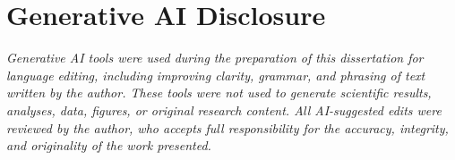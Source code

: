 \section*{Generative AI Disclosure}

\textit{Generative AI tools were used during the preparation of this dissertation for language editing, including improving clarity, grammar, and phrasing of text written by the author. These tools were not used to generate scientific results, analyses, data, figures, or original research content. All AI-suggested edits were reviewed by the author, who accepts full responsibility for the accuracy, integrity, and originality of the work presented.}
